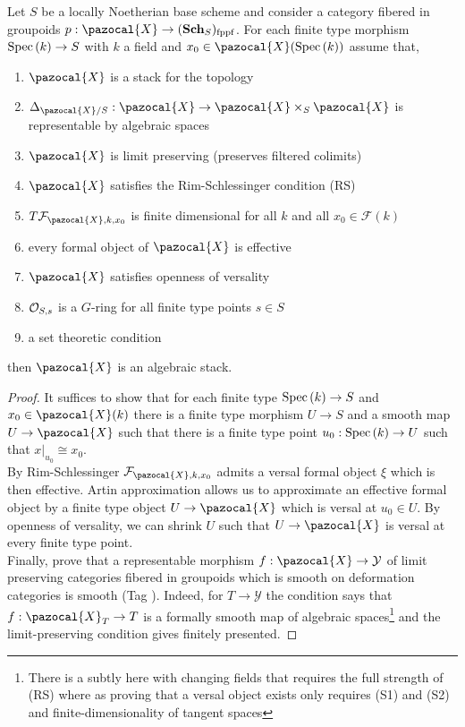 \documentclass[12pt]{article}
\newcommand{\fppf}{\mathrm{fppf}}
\renewcommand{\X}{\pazocal{X}}
\newcommand{\Y}{\mathcal{Y}}
\renewcommand{\F}{\mathcal{F}}
\begin{document}
\begin{theorem}
Let $S$ be a locally Noetherian base scheme and consider a category fibered in groupoids $p : \X \to (\Sch_S)_{\fppf}$. For each finite type morphism $\mathrm{Spec}\left( k \right) \to S$ with $k$ a field and $x_0 \in \X(\Spec{k})$  assume that,
\begin{enumerate}
\item $\X$ is a stack for the \etale topology
\item $\Delta_{\X / S} : \X \to \X \times_S \X$ is representable by algebraic spaces
\item $\X$ is limit preserving (preserves filtered colimits)
\item $\X$ satisfies the Rim-Schlessinger condition (RS)
\item $T \F_{\X, k, x_0}$ is finite dimensional for all $k$ and all $x_0 \in \F(k)$
\item every formal object of $\X$ is effective
\item $\X$ satisfies openness of versality
\item $\mathcal{O}_{S, s}$ is a $G$-ring for all finite type points $s \in S$ 
\item a set theoretic condition
\end{enumerate}
then $\X$ is an algebraic stack. 
\end{theorem}

\begin{proof}
It suffices to show that for each finite type $\mathrm{Spec}\left( k \right) \to S$ and $x_0 \in \X(k)$ there is a finite type morphism $U \to S$ and a smooth map $U \to \X$ such that there is a finite type point $u_0 : \mathrm{Spec}\left( k \right) \to U$ such that $x|_{u_0} \cong x_0$.
\bigskip\\
By Rim-Schlessinger $\F_{\X, k, x_0}$ admits a versal formal object $\xi$ which is then effective. Artin approximation allows us to approximate an effective formal object by a finite type object $U \to \X$ which is versal at $u_0 \in U$. By openness of versality, we can shrink $U$ such that $U \to \X$ is versal at every finite type point.  
\bigskip\\
Finally, prove that a representable morphism $f : \X \to \Y$ of limit preserving categories fibered in groupoids which is smooth on deformation categories is smooth (Tag ). Indeed, for $T \to \Y$ the condition says that $f : \X_T \to T$ is a formally smooth map of algebraic spaces\footnote{There is a subtly here with changing fields that requires the full strength of (RS) where as proving that a versal object exists only requires (S1) and (S2) and finite-dimensionality of tangent spaces} and the limit-preserving condition gives finitely presented. 
\end{proof}
\end{document}

